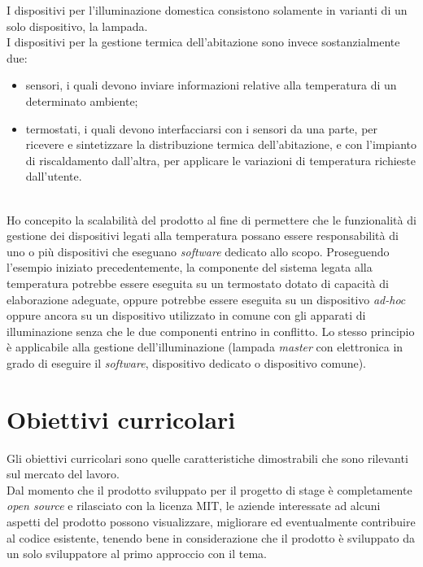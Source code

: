 I dispositivi per l'illuminazione domestica consistono solamente in varianti di un solo dispositivo, la lampada. \\
I dispositivi per la gestione termica dell'abitazione sono invece sostanzialmente due:
\begin{itemize}
  \item sensori, i quali devono inviare informazioni relative alla temperatura di un determinato ambiente;
  \item termostati, i quali devono interfacciarsi con i sensori da una parte, per ricevere e sintetizzare la distribuzione termica dell'abitazione, e con l'impianto di riscaldamento dall'altra, per applicare le variazioni di temperatura richieste dall'utente.
\end{itemize}
\\
Ho concepito la scalabilità del prodotto al fine di permettere che le funzionalità di gestione dei dispositivi legati alla temperatura possano essere responsabilità di uno o più dispositivi che eseguano \emph{software} dedicato allo scopo.
Proseguendo l'esempio iniziato precedentemente, la componente del sistema legata alla temperatura potrebbe essere eseguita su un termostato dotato di capacità di elaborazione adeguate, oppure potrebbe essere eseguita su un dispositivo \emph{ad-hoc} oppure ancora su un dispositivo utilizzato in comune con gli apparati di illuminazione senza che le due componenti entrino in conflitto.
Lo stesso principio è applicabile alla gestione dell'illuminazione (lampada \emph{master} con elettronica in grado di eseguire il \emph{software}, dispositivo dedicato o dispositivo comune).


\section{Obiettivi curricolari}

Gli obiettivi curricolari sono quelle caratteristiche dimostrabili che sono rilevanti sul mercato del lavoro. \\

Dal momento che il prodotto sviluppato per il progetto di stage è completamente \emph{open source} e rilasciato con la licenza \gls{MIT}, le aziende interessate ad alcuni aspetti del prodotto possono visualizzare, migliorare ed eventualmente contribuire al codice esistente, tenendo bene in considerazione che il prodotto è sviluppato da un solo sviluppatore al primo approccio con il tema. \\

